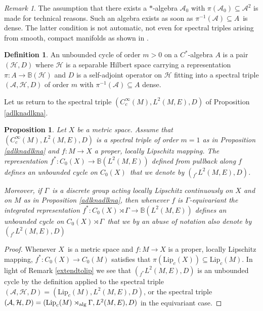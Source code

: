 \documentclass[a4paper,reqno]{amsart}
\numberwithin{equation}{section}
\newtheorem{prop}[thm]{Proposition}
\theoremstyle{definition}
\newtheorem{definition}[thm]{Definition}
\theoremstyle{remark}
\newtheorem{remark}[thm]{Remark}
\begin{document}
\begin{remark}
The assumption that there exists a $*$-algebra $\mathcal{A}_0$ with $\pi(\mathcal{A}_0)\subseteq \mathcal{A}^2$ is made for technical reasons. Such an algebra exists as soon as $\pi^{-1}(\mathcal{A})\subseteq A$ is dense. The latter condition is not automatic, not even for spectral triples arising from smooth, compact manifolds as shown in \cite[Appendix A]{kkbordism}.
\end{remark}




\begin{definition}
An unbounded cycle of order $m>0$ on a $C^*$-algebra $A$ is a pair $(\mathcal{H},D)$ where $\mathcal{H}$ is a separable Hilbert space carrying a representation $\pi:A\to \mathbb{B}(\mathcal{H})$ and $D$ is a self-adjoint operator on $\mathcal{H}$ fitting into a spectral triple $(\mathcal{A},\mathcal{H},D)$ of order $m$ with $\pi^{-1}(\mathcal{A})\subseteq A$ dense.
\end{definition}




Let us return to the spectral triple $(C^\infty_c(M),L^2(M,E),D)$ of Proposition \ref{adlknadlkna}. 




\begin{prop}
\label{adlknadlknawithf}
Let $X$ be a metric space. Assume that $(C^\infty_c(M),L^2(M,E),D)$ is a spectral triple of order $m=1$ as in Proposition \ref{adlknadlkna} and $f:M\to X$ a proper, locally Lipschitz mapping. The representation $f^*:C_0(X)\to \mathbb{B}(L^2(M,E))$ defined from pullback along $f$ defines an unbounded cycle on $C_0(X)$ that we denote by $(_{f^*}L^2(M,E),D)$.


Moreover, if $\Gamma$ is a discrete group acting locally Lipschitz continuously on $X$ and on $M$ as in Proposition \ref{adlknadlkna}, then whenever $f$ is $\Gamma$-equivariant the integrated representation $f^*:C_0(X)\rtimes \Gamma\to \mathbb{B}(L^2(M,E))$ defines an unbounded cycle on $C_0(X)\rtimes \Gamma$ that we by an abuse of notation also denote by $(_{f^*}L^2(M,E),D)$
\end{prop}


\begin{proof}
Whenever $X$ is a metric space and $f:M\to X$ is a proper, locally Lipschitz mapping, $f^*:C_0(X)\to C_0(M)$ satisfies that $\pi(\mathrm{Lip}_c(X))\subseteq \mathrm{Lip}_c(M)$. In light of Remark \ref{extendtolip} we see that $(_{f^*}L^2(M,E),D)$ is an unbounded cycle by the definition applied to the spectral triple $(\mathcal{A},\mathcal{H},D)=(\mathrm{Lip}_c(M),L^2(M,E),D)$, or the spectral triple $(\mathcal{A},\mathcal{H},D)=(\mathrm{Lip}_c(M)\rtimes_{\rm alg}\Gamma,L^2(M,E),D)$ in the equivariant case.
\end{proof}
\end{document}
